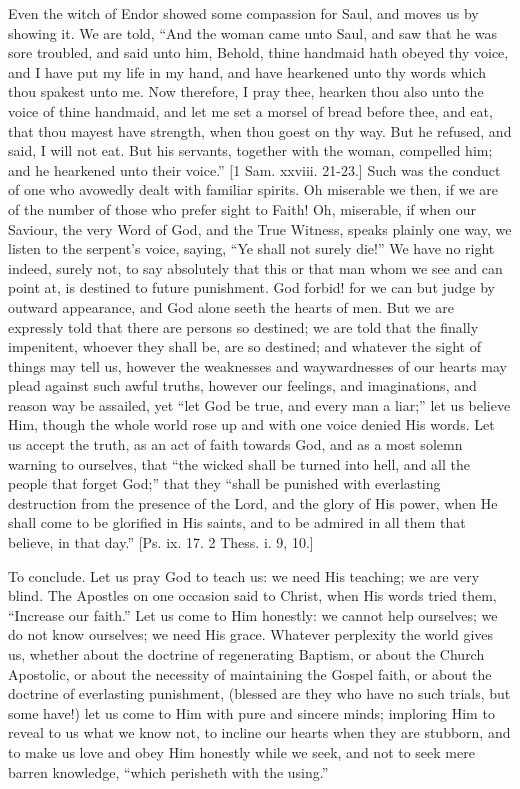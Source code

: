 Even the witch of Endor showed some compassion for Saul, and moves
us by showing it. We are told, ``And the woman came unto Saul, and
saw that he was sore troubled, and said unto him, Behold, thine
handmaid hath obeyed thy voice, and I have put my life in my hand, and
have hearkened unto thy words which thou spakest unto me. Now
therefore, I pray thee, hearken thou also unto the voice of thine
handmaid, and let me set a morsel of bread before thee, and eat, that
thou mayest have strength, when thou goest on thy way. But he refused,
and said, I will not eat. But his servants, together with the woman,
compelled him; and he hearkened unto their voice.'' [1 Sam. xxviii.
21-23.] Such was the conduct of one who avowedly dealt with familiar
spirits. Oh miserable we then, if we are of the number of those who
prefer sight to Faith! Oh, miserable, if when our Saviour, the very
Word of God, and the True Witness, speaks plainly one way, we listen
to the serpent's voice, saying, ``Ye shall not surely die!''
We have no right indeed, surely not, to say absolutely that this or
that man whom we see and can point at, is destined to future
punishment. God forbid! for we can but judge by outward appearance,
and God alone seeth the hearts of men. But we are expressly told that
there are persons so destined; we are told that the finally
impenitent, whoever they shall be, are so destined; and whatever the
sight of things may tell us, however the weaknesses and waywardnesses
of our hearts may plead against such awful truths, however our
feelings, and imaginations, and reason way be assailed, yet ``let
God be true, and every man a liar;'' let us believe Him, though
the whole world rose up and with one voice denied His words. Let us
accept the truth, as an act of faith towards God, and as a most solemn
warning to ourselves, that ``the wicked shall be turned into hell,
and all the people that forget God;'' that they ``shall be
punished with everlasting destruction from the presence of the Lord,
and the glory of His power, when He shall come to be glorified in His
saints, and to be admired in all them that believe, in that day.''
[Ps. ix. 17. 2 Thess. i. 9, 10.]

To conclude. Let us pray God to teach us: we need His teaching; we
are very blind. The Apostles on one occasion said to Christ, when His
words tried them, ``Increase our faith.'' Let us come to Him
honestly: we cannot help ourselves; we do not know ourselves; we need
His grace. Whatever perplexity the world gives us, whether about the
doctrine of regenerating Baptism, or about the Church Apostolic, or
about the necessity of maintaining the Gospel faith, or about the
doctrine of everlasting punishment, (blessed are they who have no such
trials, but some have!) let us come to Him with pure and sincere
minds; imploring Him to reveal to us what we know not, to incline our
hearts when they are stubborn, and to make us love and obey Him
honestly while we seek, and not to seek mere barren knowledge,
``which perisheth with the using.''

